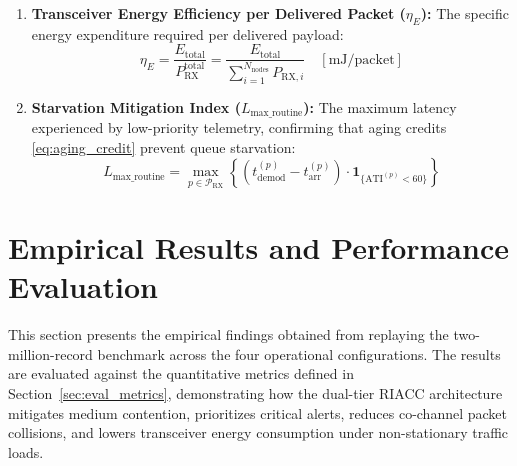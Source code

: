 \documentclass[preprint,review,12pt]{elsarticle}
\begin{document}
\begin{enumerate}
    \item \textbf{Transceiver Energy Efficiency per Delivered Packet ($\eta_E$):} The specific energy expenditure required per delivered payload:
    \begin{equation}
        \eta_E = \frac{ E_{\text{total}} }{ P_{\text{RX}}^{\text{total}} } = \frac{ E_{\text{total}} }{ \sum_{i=1}^{N_{\text{nodes}}} P_{\text{RX}, i} } \quad \left[\text{mJ/packet}\right]
        \label{eq:eta_e}
    \end{equation}

    \item \textbf{Starvation Mitigation Index ($L_{\text{max\_routine}}$):} The maximum latency experienced by low-priority telemetry, confirming that aging credits \eqref{eq:aging_credit} prevent queue starvation:
    \begin{equation}
        L_{\text{max\_routine}} = \max_{p \in \mathcal{P}_{\text{RX}}} \left\{ \left( t_{\text{demod}}^{(p)} - t_{\text{arr}}^{(p)} \right) \cdot \mathbf{1}_{\{\text{ATI}^{(p)} < 60\}} \right\}
        \label{eq:starvation_index}
    \end{equation}
\end{enumerate}


\section{Empirical Results and Performance Evaluation}
\label{sec:results}

This section presents the empirical findings obtained from replaying the two-million-record benchmark across the four operational configurations. The results are evaluated against the quantitative metrics defined in Section~\ref{sec:eval_metrics}, demonstrating how the dual-tier RIACC architecture mitigates medium contention, prioritizes critical alerts, reduces co-channel packet collisions, and lowers transceiver energy consumption under non-stationary traffic loads.
\end{document}

